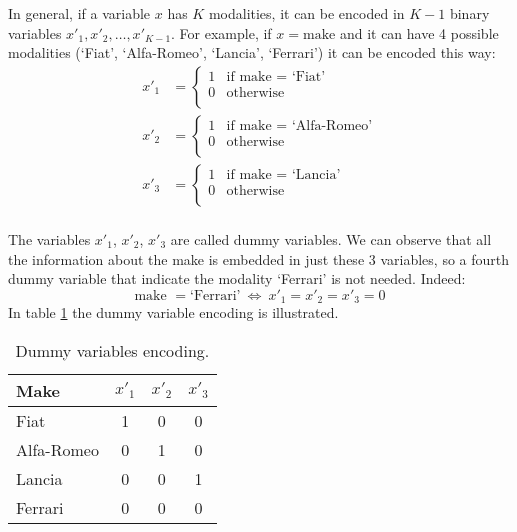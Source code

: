 \documentclass[a4paper, nobind]{templates/ociamthesis}
\theoremstyle{definition}
\theoremstyle{definition}
\theoremstyle{definition}
\theoremstyle{remark}
\begin{document}
In general, if a variable \(x\) has \(K\) modalities, it can be encoded in \(K-1\) binary variables \(x'_1, x'_2, \dots, x'_{K-1}\). For example, if \(x = \text{make}\) and it can have 4 possible modalities (`Fiat', `Alfa-Romeo', `Lancia', `Ferrari') it can be encoded this way:
\begin{align*}
x'_1 & = \begin{cases}
1 & \text{if } \text{make } = \text{ `Fiat'} \\
0 & \text{otherwise} \\
\end{cases}
\\
x'_2 & = \begin{cases}
1 & \text{if } \text{make } = \text{ `Alfa-Romeo'} \\
0 & \text{otherwise} \\
\end{cases}
\\
x'_3 & = \begin{cases}
1 & \text{if } \text{make } = \text{ `Lancia'} \\
0 & \text{otherwise} \\
\end{cases}
\\
\end{align*}

The variables \(x'_1\), \(x'_2\), \(x'_3\) are called dummy variables. We can observe that all the information about the make is embedded in just these 3 variables, so a fourth dummy variable that indicate the modality `Ferrari' is not needed. Indeed:
\[
\text{make } = \text{`Ferrari'} \ \Longleftrightarrow \ x'_1=x'_2=x'_3=0
\]
In table \ref{tab:dummy-variables} the dummy variable encoding is illustrated.

\begin{table}[!h]

\caption{\label{tab:dummy-variables}Dummy variables encoding.}
\centering
\begin{tabular}[t]{lccc}

\textbf{Make} & \textbf{$x'_1$} & \textbf{$x'_2$} & \textbf{$x'_3$}\\
\midrule\addlinespace
Fiat & 1 & 0 & 0\\
Alfa-Romeo & 0 & 1 & 0\\
Lancia & 0 & 0 & 1\\
Ferrari & 0 & 0 & 0\\

\end{tabular}
\end{table}
\end{document}
